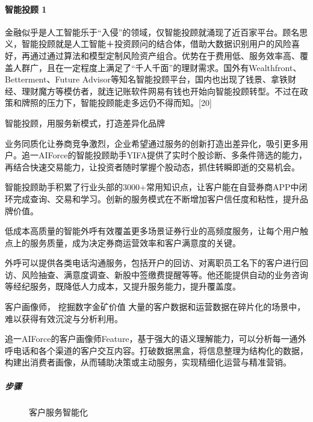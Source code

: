 \documentclass[letterpaper,10pt,english]{sphinxmanual}
\begin{document}
\paragraph{智能投顾 1\sphinxfootnotemark[755]}
\label{\detokenize{chapter_project/AI_Finance:id12}}%
\begin{footnotetext}[755]\sphinxAtStartFootnote
{}
%
\end{footnotetext}\ignorespaces 
金融似乎是人工智能乐于“入侵”的领域，仅智能投顾就涌现了近百家平台。顾名思义，智能投顾就是人工智能＋投资顾问的结合体，借助大数据识别用户的风险喜好，再通过通过算法和模型定制风险资产组合。优势在于费用低、服务效率高、覆盖人群广，且在一定程度上满足了“千人千面”的理财需求。国外有Wealthfront、Betterment、Future
Advisor等知名智能投顾平台，国内也出现了钱景、拿铁财经、理财魔方等模仿者，就连记账软件网易有钱也开始向智能投顾转型。不过在政策和牌照的压力下，智能投顾能走多远仍不得而知。{[}20{]}

智能投顾，用服务新模式，打造差异化品牌

业务同质化让券商竞争激烈，企业希望通过服务的创新打造出差异化，吸引更多用户。追一AIForce的智能投顾助手YIFA提供了实时个股诊断、多条件筛选的能力，再结合快速交易能力，让投资者随时掌握个股动态，抓住转瞬即逝的交易机会。

智能投顾助手积累了行业头部的3000+常用知识点，让客户能在自营券商APP中闭环完成查询、交易和学习。创新的服务模式在不断增加客户信任度和粘性，提升品牌价值。

低成本高质量的智能外呼有效覆盖更多场景证券行业的高频度服务，让每个用户触点上的服务质量，成为决定券商运营效率和客户满意度的关键。

外呼可以提供各类电话沟通服务，包括开户的回访、对离职员工名下的客户进行回访、风险抽查、满意度调查、新股中签缴费提醒等等。他还能提供自动的业务咨询等经纪服务，既降低人力成本，又提升服务能力，提升覆盖度。

客户画像师， 挖掘数字金矿价值
大量的客户数据和运营数据在碎片化的场景中，难以获得有效沉淀与分析利用。

追一AIForce的客户画像师Feature，基于强大的语义理解能力，可以分析每一通外呼电话和各个渠道的客户交互内容。打破数据黑盒，将信息整理为结构化的数据，构建出消费者画像，从而辅助决策或主动服务，实现精细化运营与精准营销。


\subparagraph{步骤}
\label{\detokenize{chapter_project/AI_Finance:id13}}
\begin{figure}[H]
\centering
\capstart

\noindent{}
\caption{客户服务智能化}\label{\detokenize{chapter_project/AI_Finance:id37}}\end{figure}
\end{document}
